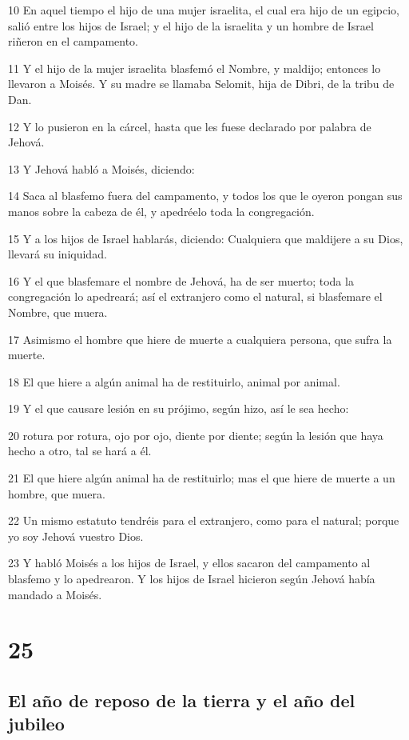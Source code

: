 \par 10 En aquel tiempo el hijo de una mujer israelita, el cual era hijo de un egipcio, salió entre los hijos de Israel; y el hijo de la israelita y un hombre de Israel riñeron en el campamento.
\par 11 Y el hijo de la mujer israelita blasfemó el Nombre, y maldijo; entonces lo llevaron a Moisés. Y su madre se llamaba Selomit, hija de Dibri, de la tribu de Dan.
\par 12 Y lo pusieron en la cárcel, hasta que les fuese declarado por palabra de Jehová.
\par 13 Y Jehová habló a Moisés, diciendo:
\par 14 Saca al blasfemo fuera del campamento, y todos los que le oyeron pongan sus manos sobre la cabeza de él, y apedréelo toda la congregación.
\par 15 Y a los hijos de Israel hablarás, diciendo: Cualquiera que maldijere a su Dios, llevará su iniquidad.
\par 16 Y el que blasfemare el nombre de Jehová, ha de ser muerto; toda la congregación lo apedreará; así el extranjero como el natural, si blasfemare el Nombre, que muera.
\par 17 Asimismo el hombre que hiere de muerte a cualquiera persona, que sufra la muerte.
\par 18 El que hiere a algún animal ha de restituirlo, animal por animal.
\par 19 Y el que causare lesión en su prójimo, según hizo, así le sea hecho:
\par 20 rotura por rotura, ojo por ojo, diente por diente; según la lesión que haya hecho a otro, tal se hará a él.
\par 21 El que hiere algún animal ha de restituirlo; mas el que hiere de muerte a un hombre, que muera.
\par 22 Un mismo estatuto tendréis para el extranjero, como para el natural;  porque yo soy Jehová vuestro Dios.
\par 23 Y habló Moisés a los hijos de Israel, y ellos sacaron del campamento al blasfemo y lo apedrearon. Y los hijos de Israel hicieron según Jehová había mandado a Moisés.

\chapter{25}

\section*{El año de reposo de la tierra y el año del jubileo}

